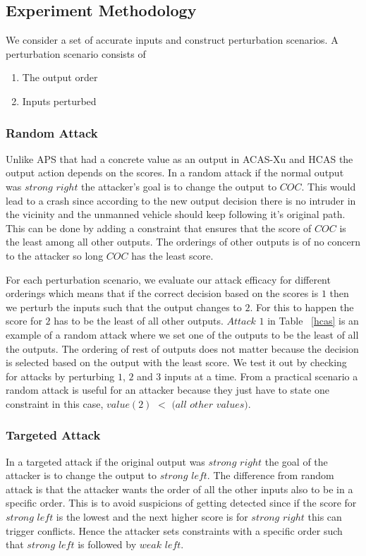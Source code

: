 \subsection{Experiment Methodology}
We consider a set of accurate inputs and construct perturbation scenarios. A perturbation scenario consists of 
\begin{enumerate}
	\item The output order
	\item Inputs perturbed
\end{enumerate}

\subsubsection{Random Attack}
Unlike \ac{APS} that had a concrete value as an output in \ac{ACAS-Xu} and \ac{HCAS} the output action depends on the scores. 
In a random attack if the normal output was $strong$ $right$ the attacker's goal
is to change the output to $COC$.
This would lead to a crash since according to the new output decision there is no intruder in the vicinity and the unmanned vehicle should keep following it's original path. 
This can be done by adding a constraint that ensures that the score of $COC$ is the least among all other outputs. 
The orderings of other outputs is of no concern to the attacker so long $COC$ has the least score. 

For each perturbation scenario, we evaluate our attack efficacy for different orderings which means that if the correct decision based on the scores is $1$ then we perturb the inputs such that the output changes to $2$.
For this to happen the score for $2$ has to be the least of all other outputs. 
$Attack$ $1$ in Table ~\ref{hcas} is an example of a random attack where we set one of the outputs to be the least of all the outputs. 
The ordering of rest of outputs does not matter because the decision is selected based on the output with the least score. 
We test it out by checking for attacks by perturbing $1$, $2$ and $3$ inputs at a time. 
From a practical scenario a random attack is useful for an attacker because
they just have to state one constraint in this case, $value(2)$ $<$ $(all$ $other$ $values)$.

\subsubsection{Targeted Attack}

 
In a targeted attack if the original output was $strong$ $right$ the goal of the attacker is to change the output to $strong$ $left$. 
The difference from random attack is that the attacker wants the order of all the other inputs also to be in a specific order. 
This is to avoid suspicions of getting detected since if the score for $strong$ $left$ is the lowest and the next higher score is for $strong$ $right$ this can trigger conflicts. 
Hence the attacker sets constraints with a specific order such that $strong$ $left$ is followed by $weak$ $left$. 

